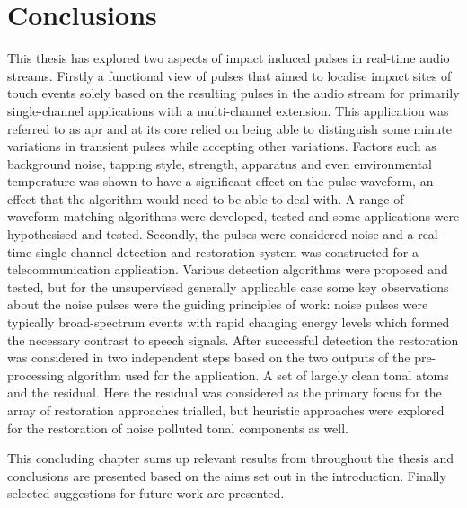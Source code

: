 \def\baselinestretch{1}
\chapter{Conclusions}\label{ch:Conclusions}
\ifpdf
    \graphicspath{{Conclusions/ConclusionsFigs/PNG/}{Conclusions/ConclusionsFigs/PDF/}{Conclusions/ConclusionsFigs/}}
\else
    \graphicspath{{Conclusions/ConclusionsFigs/EPS/}{Conclusions/ConclusionsFigs/}}
\fi

\def\baselinestretch{1.6}


This thesis has explored two aspects of impact induced pulses in real-time audio streams. Firstly a functional view of pulses that aimed to localise impact sites of touch events solely based on the resulting pulses in the audio stream for primarily single-channel applications with a multi-channel extension. This application was referred to as \gls{apr} and at its core relied on being able to distinguish some minute variations in transient pulses while accepting other variations. Factors such as background noise, tapping style, strength, apparatus and even environmental temperature was shown to have a significant effect on the pulse waveform, an effect that the algorithm would need to be able to deal with. A range of waveform matching algorithms were developed, tested and some applications were hypothesised and tested.
Secondly, the pulses were considered noise and a real-time single-channel detection and restoration system was constructed for a telecommunication application. Various detection algorithms were proposed and tested, but for the unsupervised generally applicable case some key observations about the noise pulses were the guiding principles of work: noise pulses were typically broad-spectrum events with rapid changing energy levels which formed the necessary contrast to speech signals. After successful detection the restoration was considered in two independent steps based on the two outputs of the pre-processing algorithm used for the application. A set of largely clean tonal atoms and the residual. Here the residual was considered as the primary focus for the array of restoration approaches trialled, but heuristic approaches were explored for the restoration of noise polluted tonal components as well.

This concluding chapter sums up relevant results from throughout the thesis and conclusions are presented based on the aims set out in the introduction. Finally selected suggestions for future work are presented.

